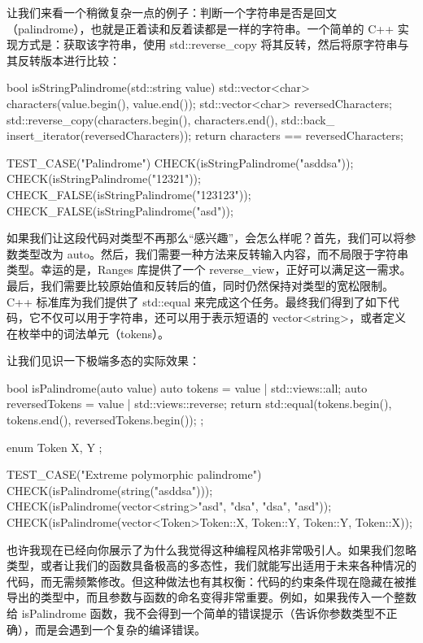 让我们来看一个稍微复杂一点的例子：判断一个字符串是否是回文（palindrome），也就是正着读和反着读都是一样的字符串。一个简单的 C++ 实现方式是：获取该字符串，使用 std::reverse\_copy 将其反转，然后将原字符串与其反转版本进行比较：

\begin{cpp}
bool isStringPalindrome(std::string value){
  std::vector<char> characters(value.begin(), value.end());
  std::vector<char> reversedCharacters;
  std::reverse_copy(characters.begin(), characters.end(), std::back_
  insert_iterator(reversedCharacters));
  return characters == reversedCharacters;
}

TEST_CASE("Palindrome"){
  CHECK(isStringPalindrome("asddsa"));
  CHECK(isStringPalindrome("12321"));
  CHECK_FALSE(isStringPalindrome("123123"));
  CHECK_FALSE(isStringPalindrome("asd"));
}
\end{cpp}

如果我们让这段代码对类型不再那么“感兴趣”，会怎么样呢？首先，我们可以将参数类型改为 auto。然后，我们需要一种方法来反转输入内容，而不局限于字符串类型。幸运的是，Ranges 库提供了一个 reverse\_view，正好可以满足这一需求。最后，我们需要比较原始值和反转后的值，同时仍然保持对类型的宽松限制。C++ 标准库为我们提供了 std::equal 来完成这个任务。最终我们得到了如下代码，它不仅可以用于字符串，还可以用于表示短语的 vector<string>，或者定义在枚举中的词法单元（tokens）。

让我们见识一下极端多态的实际效果：

\begin{cpp}
bool isPalindrome(auto value){
  auto tokens = value | std::views::all;
  auto reversedTokens = value | std::views::reverse;
  return std::equal(tokens.begin(), tokens.end(), reversedTokens.begin());
};

enum Token{
  X, Y
};

TEST_CASE("Extreme polymorphic palindrome"){
  CHECK(isPalindrome(string("asddsa")));
  CHECK(isPalindrome(vector<string>{"asd", "dsa", "dsa", "asd"}));
  CHECK(isPalindrome(vector<Token>{Token::X, Token::Y, Token::Y, Token::X}));
}
\end{cpp}

也许我现在已经向你展示了为什么我觉得这种编程风格非常吸引人。如果我们忽略类型，或者让我们的函数具备极高的多态性，我们就能写出适用于未来各种情况的代码，而无需频繁修改。但这种做法也有其权衡：代码的约束条件现在隐藏在被推导出的类型中，而且参数与函数的命名变得非常重要。例如，如果我传入一个整数给 isPalindrome 函数，我不会得到一个简单的错误提示（告诉你参数类型不正确），而是会遇到一个复杂的编译错误。

